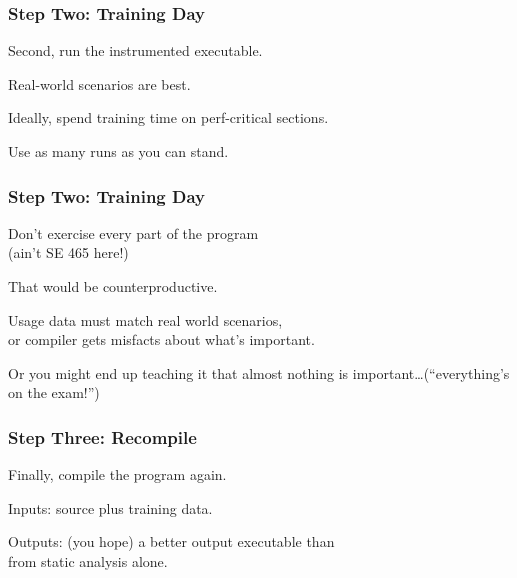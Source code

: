\begin{frame}
\frametitle{Step Two: Training Day}

\begin{changemargin}{2cm}

Second, run the instrumented executable.

Real-world scenarios are best.

Ideally, spend training time on perf-critical sections. 

Use as many runs as you can stand.
\end{changemargin}
\end{frame}



\begin{frame}
\frametitle{Step Two: Training Day}


\begin{changemargin}{2cm}
Don't exercise every part of the program\\
(ain't SE 465 here!)

That would be counterproductive.

Usage data must match real world scenarios,\\
or compiler gets misfacts about what's important. 

Or you might end up teaching it that almost nothing
is important\ldots (``everything's on the exam!'')
\end{changemargin}

\end{frame}



\begin{frame}
\frametitle{Step Three: Recompile}


\begin{changemargin}{2cm}
Finally, compile the program again.

Inputs: source plus training data.

Outputs: (you hope) a better output executable than\\
from static analysis alone.
\end{changemargin}

\end{frame}




